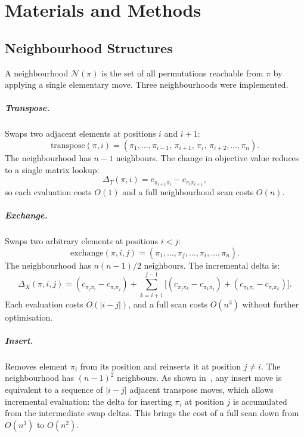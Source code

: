 \chapter{Materials and Methods}

\section{Neighbourhood Structures}

A neighbourhood $\mathcal{N}(\pi)$ is the set of all permutations reachable
from $\pi$ by applying a single elementary move. Three neighbourhoods were
implemented.

\paragraph{Transpose.} Swaps two adjacent elements at positions $i$ and $i+1$:
\[
    \text{transpose}(\pi, i) =
    (\pi_1, \ldots, \pi_{i-1},\, \pi_{i+1},\, \pi_i,\, \pi_{i+2}, \ldots, \pi_n).
\]
The neighbourhood has $n-1$ neighbours. The change in objective value reduces
to a single matrix lookup:
\begin{equation}
    \Delta_T(\pi, i) = c_{\pi_{i+1}\pi_i} - c_{\pi_i\pi_{i+1}},
    \label{eq:delta_transpose}
\end{equation}
so each evaluation costs $O(1)$ and a full neighbourhood scan costs $O(n)$.

\paragraph{Exchange.} Swaps two arbitrary elements at positions $i < j$:
\[
    \text{exchange}(\pi, i, j) =
    (\pi_1, \ldots, \pi_j, \ldots, \pi_i, \ldots, \pi_n).
\]
The neighbourhood has $n(n-1)/2$ neighbours. The incremental delta is:
\begin{equation}
    \Delta_X(\pi, i, j) =
    (c_{\pi_j\pi_i} - c_{\pi_i\pi_j})
    + \sum_{k=i+1}^{j-1}
    \bigl[(c_{\pi_j\pi_k} - c_{\pi_k\pi_j})
         + (c_{\pi_k\pi_i} - c_{\pi_i\pi_k})\bigr].
    \label{eq:delta_exchange}
\end{equation}
Each evaluation costs $O(|i - j|)$, and a full scan costs $O(n^3)$ without
further optimisation.

\paragraph{Insert.} Removes element $\pi_i$ from its position and reinserts
it at position $j \neq i$. The neighbourhood has $(n-1)^2$ neighbours. As
shown in~\cite{SchStu04}, any insert move is equivalent to a sequence of
$|i - j|$ adjacent transpose moves, which allows incremental evaluation:
the delta for inserting $\pi_i$ at position $j$ is accumulated from the
intermediate swap deltas. This brings the cost of a full scan down from
$O(n^3)$ to $O(n^2)$.

